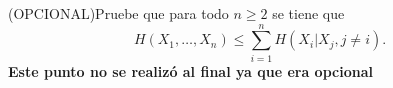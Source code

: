 (OPCIONAL)Pruebe que para todo $n \geq 2$ se tiene que 
\[
H(X_1, \dots, X_n) \leq \sum_{i=1}^{n} H(X_i | X_j, j \neq i).
\]
\textbf{Este punto no se realizó al final ya que era opcional}\\



